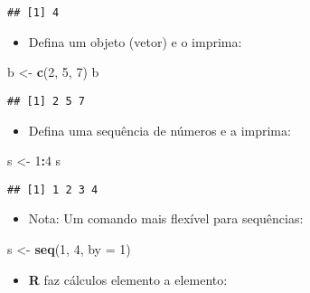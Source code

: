 \documentclass[]{article}
\newenvironment{Shaded}{\begin{snugshade}}{\end{snugshade}}
\newcommand{\KeywordTok}[1]{\textcolor[rgb]{0.13,0.29,0.53}{\textbf{#1}}}
\newcommand{\DataTypeTok}[1]{\textcolor[rgb]{0.13,0.29,0.53}{#1}}
\newcommand{\DecValTok}[1]{\textcolor[rgb]{0.00,0.00,0.81}{#1}}
\newcommand{\StringTok}[1]{\textcolor[rgb]{0.31,0.60,0.02}{#1}}
\newcommand{\OperatorTok}[1]{\textcolor[rgb]{0.81,0.36,0.00}{\textbf{#1}}}
\newcommand{\NormalTok}[1]{#1}
\providecommand{\tightlist}{%
  \setlength{\itemsep}{0pt}\setlength{\parskip}{0pt}}
\begin{document}
\begin{verbatim}
## [1] 4
\end{verbatim}

\begin{itemize}
\tightlist
\item
  Defina um objeto (vetor) e o imprima:
\end{itemize}

\begin{Shaded}
\begin{Highlighting}[]
\NormalTok{b <-}\StringTok{ }\KeywordTok{c}\NormalTok{(}\DecValTok{2}\NormalTok{, }\DecValTok{5}\NormalTok{, }\DecValTok{7}\NormalTok{)}
\NormalTok{b}
\end{Highlighting}
\end{Shaded}

\begin{verbatim}
## [1] 2 5 7
\end{verbatim}

\begin{itemize}
\tightlist
\item
  Defina uma sequência de números e a imprima:
\end{itemize}

\begin{Shaded}
\begin{Highlighting}[]
\NormalTok{s <-}\StringTok{ }\DecValTok{1}\OperatorTok{:}\DecValTok{4}
\NormalTok{s}
\end{Highlighting}
\end{Shaded}

\begin{verbatim}
## [1] 1 2 3 4
\end{verbatim}

\begin{itemize}
\tightlist
\item
  Nota: Um comando mais flexível para sequências:
\end{itemize}

\begin{Shaded}
\begin{Highlighting}[]
\NormalTok{s <-}\StringTok{ }\KeywordTok{seq}\NormalTok{(}\DecValTok{1}\NormalTok{, }\DecValTok{4}\NormalTok{, }\DataTypeTok{by =} \DecValTok{1}\NormalTok{)}
\end{Highlighting}
\end{Shaded}

\begin{itemize}
\tightlist
\item
  \textbf{R} faz cálculos elemento a elemento:
\end{itemize}
\end{document}
